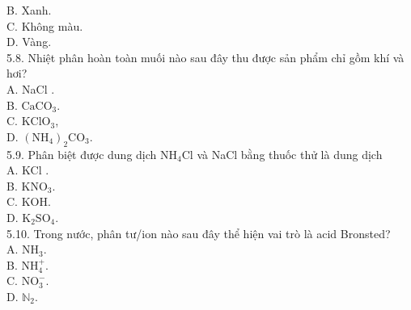 \documentclass[10pt]{article}
\begin{document}
B. Xanh.\\
C. Không màu.\\
D. Vàng.\\
5.8. Nhiệt phân hoàn toàn muối nào sau đây thu được sản phẩm chỉ gồm khí và hơi?\\
A. NaCl .\\
B. $\mathrm{CaCO}_{3}$.\\
C. $\mathrm{KClO}_{3}$,\\
D. $\left(\mathrm{NH}_{4}\right)_{2} \mathrm{CO}_{3}$.\\
5.9. Phân biệt được dung dịch $\mathrm{NH}_{4} \mathrm{Cl}$ và NaCl bằng thuốc thử là dung dịch\\
A. KCl .\\
B. $\mathrm{KNO}_{3}$.\\
C. KOH.\\
D. $\mathrm{K}_{2} \mathrm{SO}_{4}$.\\
5.10. Trong nước, phân tư/ion nào sau đây thể hiện vai trò là acid Bronsted?\\
A. $\mathrm{NH}_{3}$.\\
B. $\mathrm{NH}_{4}^{+}$.\\
C. $\mathrm{NO}_{3}^{-}$.\\
D. $\mathbb{N}_{2}$.
\end{document}
